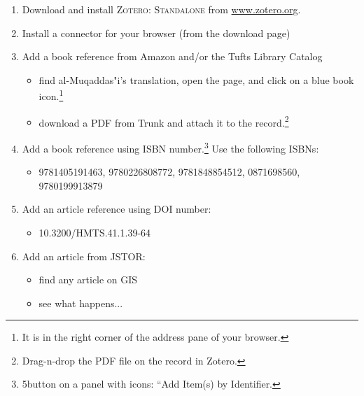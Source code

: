 \documentclass{tufte-handout} %
\begin{document}
\begin{enumerate}
  \item Download and install \textsc{Zotero: Standalone} from \href{https://www.zotero.org/}{www.zotero.org}.
  
  \item Install a connector for your browser (from the download page)  
  \item Add a book reference from Amazon and/or the Tufts Library Catalog
  
  \begin{itemize}
  \item find al-Muqaddas"i's translation, open the page, and click on a blue book icon.\footnote{It is in the right corner of the address pane of your browser.}
  \item download a PDF from Trunk and attach it to the record.\footnote{Drag-n-drop the PDF file on the record in Zotero.} 
  \end{itemize}  
  
  \item Add a book reference using ISBN number.\footnote{5\thh button on a panel with icons: ``Add Item(s) by Identifier.} Use the following ISBNs:
  \begin{itemize}
  \item 9781405191463, 9780226808772, 9781848854512, 0871698560, 9780199913879
  \end{itemize}  
  
  \item Add an article reference using DOI number:
  \begin{itemize}
  \item 10.3200/HMTS.41.1.39-64
  \end{itemize}
  
  \item Add an article from JSTOR:
  \begin{itemize}
  \item find any article on GIS
  \item see what happens...
  \end{itemize}      

\end{enumerate}






\printindex %
\end{document}
